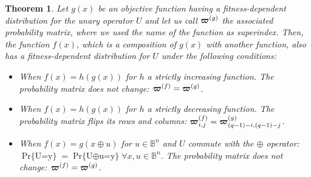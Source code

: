 \documentclass{article}
\newtheorem{theorem}{Theorem}
\def\vec#1{\mathchoice{\mbox{\boldmath$\displaystyle#1$}}
  {\mbox{\boldmath$\textstyle#1$}}
  {\mbox{\boldmath$\scriptstyle#1$}}
  {\mbox{\boldmath$\scriptscriptstyle#1$}}}
\newcommand{\Bo}[0]{\mathbb{B}}
\newcommand{\Prob}[1]{\mathop{\mathrm{Pr}\{#1\}}}
\begin{document}
\begin{theorem}
\label{thm:transformation}
Let $g(x)$ be an objective function having a fitness-dependent distribution for the unary operator $U$ and let us call $\vec{\varpi}^{(g)}$ the associated probability matrix, where we used the name of the function as superindex.
Then, the function $f(x)$, which is a composition of $g(x)$ with another function, also has a fitness-dependent distribution for $U$ under the following conditions:
\begin{itemize}
\item When $f(x)=h(g(x))$ for $h$ a strictly increasing function. The probability matrix does not change: $\vec{\varpi}^{(f)}=\vec{\varpi}^{(g)}$.
\item When $f(x)=h(g(x))$ for $h$ a strictly decreasing function. The probability matrix flips its rows and columns: $\vec{\varpi}^{(f)}_{i,j}=\vec{\varpi}^{(g)}_{(q-1)-i,(q-1)-j}$.
\item When $f(x)=g(x \oplus u)$ for $u \in \Bo^n$ and $U$ commute with the $\oplus$ operator: $\Prob{U(x\oplus u)=y}=\Prob{U(x)\oplus u= y} \forall x,u \in \Bo^n$. The probability matrix does not change: $\vec{\varpi}^{(f)}=\vec{\varpi}^{(g)}$.
\end{itemize}
\end{theorem}
\end{document}

